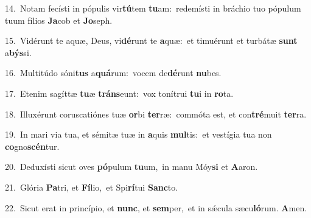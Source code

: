 {\numbfont\textcolor{\numbcolor}{14.}}~Notam fecísti in pópulis vir\-\textbf{tú}\-tem \textbf{tu}\-am:~\star redemísti in bráchio tuo pópulum tuum fílios \textbf{Ja}\-cob et \textbf{Jo}\-seph.\par
{\numbfont\textcolor{\numbcolor}{15.}}~Vidérunt te aquæ, Deus, vi\-\textbf{dé}\-runt te \textbf{a}\-quæ:~\star et timuérunt et turbátæ \textbf{sunt} a\-\textbf{býs}\-si.\par
{\numbfont\textcolor{\numbcolor}{16.}}~Multitúdo sóni\textbf{tus} a\-\textbf{quá}\-rum:~\star vocem de\-\textbf{dé}\-runt \textbf{nu}\-bes.\par
{\numbfont\textcolor{\numbcolor}{17.}}~Etenim sagíttæ \textbf{tu}\-æ \textbf{tráns}\-eunt:~\star vox tonítrui \textbf{tu}\-i in \textbf{ro}\-ta.\par
{\numbfont\textcolor{\numbcolor}{18.}}~Illuxérunt coruscatiónes tuæ \textbf{or}\-bi \textbf{ter}\-ræ:~\star commóta est, et con\-\textbf{tré}\-muit \textbf{ter}\-ra.\par
{\numbfont\textcolor{\numbcolor}{19.}}~In mari via tua, et sémitæ tuæ in \textbf{a}\-quis \textbf{mul}\-tis:~\star et vestígia tua non \textbf{co}\-gno\-\textbf{scén}\-tur.\par
{\numbfont\textcolor{\numbcolor}{20.}}~Deduxísti sicut oves \textbf{pó}\-pulum \textbf{tu}\-um,~\star in manu Móy\textbf{si} et \textbf{A}\-aron.\par
{\numbfont\textcolor{\numbcolor}{21.}}~Glória \textbf{Pa}\-tri, et \textbf{Fí}\-lio,~\star et Spi\-\textbf{rí}\-tui \textbf{Sanc}\-to.\par
{\numbfont\textcolor{\numbcolor}{22.}}~Sicut erat in princípio, et \textbf{nunc}\-, et \textbf{sem}\-per,~\star et in sǽcula sæcu\-\textbf{ló}\-rum. \textbf{A}\-men.\par
